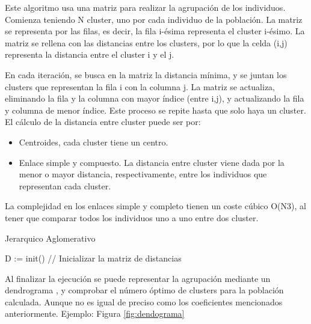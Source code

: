 Este algoritmo usa una matriz para realizar la agrupación de los individuos. Comienza teniendo N cluster, uno por cada individuo de la población. La matriz se representa por las filas, es decir, la fila i-ésima representa el cluster i-ésimo. La matriz se rellena con las distancias entre los clusters, por lo que la celda (i,j) representa la distancia entre el cluster i y el j.  

En cada iteración, se busca en la matriz la distancia mínima, y se juntan los clusters que representan la fila i con la columna j. La matriz se actualiza, eliminando la fila y la columna con mayor índice (entre i,j), y actualizando la fila y columna de menor índice. Este proceso se repite hasta que solo haya un cluster.\\


\noindent El cálculo de la distancia entre cluster puede ser por:
\begin{itemize}
\item Centroides, cada cluster tiene un centro.
\item Enlace simple y compuesto. La distancia entre cluster viene dada por la menor o mayor distancia, respectivamente, entre los individuos que representan cada cluster.
\end{itemize}
\noindent La complejidad en los enlaces simple y completo tienen un coste cúbico O(N3), al tener que comparar todos los individuos uno a uno entre dos cluster.



\begin{algorithm}[!h]
	\caption{Jerarquico Aglomerativo}
	D := init() // Inicializar la matriz de distancias\\
	
\end{algorithm}




Al finalizar la ejecución se puede representar la agrupación mediante un dendrograma \cite{espinoza2012using}, y comprobar el número óptimo de clusters para la población calculada. Aunque no es igual de preciso como los coeficientes mencionados anteriormente. Ejemplo: Figura \ref{fig:dendograma}\\


